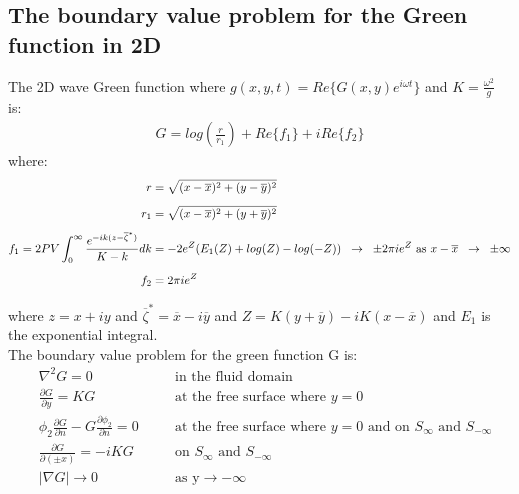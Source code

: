 \documentclass[a4paper,10pt]{article}
\newcommand{\dd}{\partial}
\newcommand{\xbar}{\overline{x}}
\newcommand{\ybar}{\overline{y}}
\begin{document}
\subsection{The boundary value problem for the Green function in 2D}
The 2D wave Green function where $g(x,y,t) = Re \big\{ G(x,y) e^{i \omega t} \big\}$ and $K = \frac{\omega^2}{g}$ is:
\begin{align} \label{G}
G = log(\frac{r}{r_1}) + Re\{f_1\} + i Re\{f_2\}
\end{align}
where:
\begin{align*}
r &= \sqrt{(x-\xbar)^2+(y-\ybar)^2}\\[0.5 em]
r_1 &= \sqrt{(x-\xbar)^2+(y+\ybar)^2}\\[0.5 em]
f_1 = 2 PV \int_0^\infty \frac{e^{-i k (z - \overline{\zeta}^*)}}{K - k} dk &= -2 e^Z (E_1(Z) + log(Z) - log(-Z)) \hspace{2mm} \rightarrow \hspace{2mm} \pm 2 \pi i e^Z \text{  as  } x-\xbar \hspace{2mm} \rightarrow \hspace{2mm} \pm \infty \\[0.5 em]
f_2 &= 2 \pi i e^Z 
\end{align*}

where $z = x + iy$ and $\overline{\zeta}^* = \xbar - i \ybar$ and $Z = K(y + \ybar) - i K (x - \xbar)$ and $E_1$ is the exponential integral. \\

The boundary value problem for the green function G is:
\begin{align}
& \nabla^2 G = 0 \quad && \text{in the fluid domain}\\[0.5 em]
& \frac{\dd G}{\dd y} = K G \quad && \text{at the free surface where $y=0$}\\[0.5 em]
& \phi_2 \frac{\dd G}{\dd n} - G \frac{\dd \phi_2}{\dd n} = 0  \quad && \text{at the free surface where $y=0$ and on } S_\infty \text{ and } S_{- \infty} \\[0.5 em]
& \frac{\dd G}{\dd (\pm x)} = -i K G \quad && \text{on } S_\infty \text{ and } S_{- \infty}\\[0.5 em]
& \rvert \nabla G \rvert \rightarrow 0 \quad && \text{as y} \rightarrow - \infty
\end{align}
\end{document}
